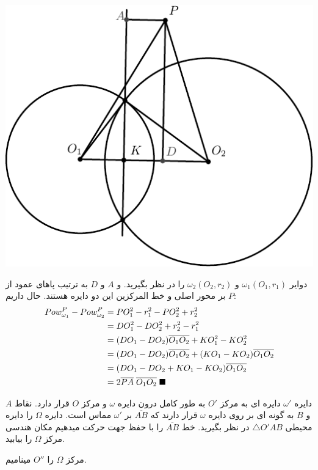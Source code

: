 \documentclass{article}
\begin{document}
\begin{center}
\includegraphics[scale=0.6]{caseypro.pdf}
\end{center}
دوایر $\omega_1(O_1,r_1)$ و  $\omega_2(O_2,r_2)$ را در نظر بگیرید. و $A$ و $D$  به ترتیب پاهای عمود از $P$ بر محور اصلی و خط المرکزین این دو دایره هستند. حال داریم:
\begin{align*}
Pow_{\omega_1}^P-Pow_{\omega_2}^P &= PO_1^2-r_1^2-PO_2^2+r_2^2 \\
&= DO_1^2-DO_2^2+r_2^2-r_1^2 \\
&=(DO_1-DO_2)\overline{O_1O_2}+KO_1^2-KO_2^2\\
&=(DO_1-DO_2)\overline{O_1O_2}+(KO_1-KO_2)\overline{O_1O_2} \\
&=(DO_1-DO_2+KO_1-KO_2)\overline{O_1O_2}\\
&=2 \overline{PA} \thickspace\overline{O_1O_2} \thickspace \blacksquare
\end{align*}



\begin{exam}{}{}
دایره $\omega'$ دایره ای به مرکز $O'$  به طور کامل درون دایره $\omega$ و مرکز $O$ قرار دارد. نقاط $A$ و $B$ به گونه ای بر روی دایره $\omega$ قرار دارند که  $\overline{AB}$ بر $\omega'$ مماس است. دایره $\Omega$  را دایره محیطی $\triangle{O'AB}$ در نظر بگیرید. خط $\overline{AB}$ را با حفظ جهت حرکت میدهیم مکان هندسی مرکز $\Omega$ را بیابید.
\end{exam}
 مرکز $\Omega$ را $O''$ مینامیم.
\end{document}
